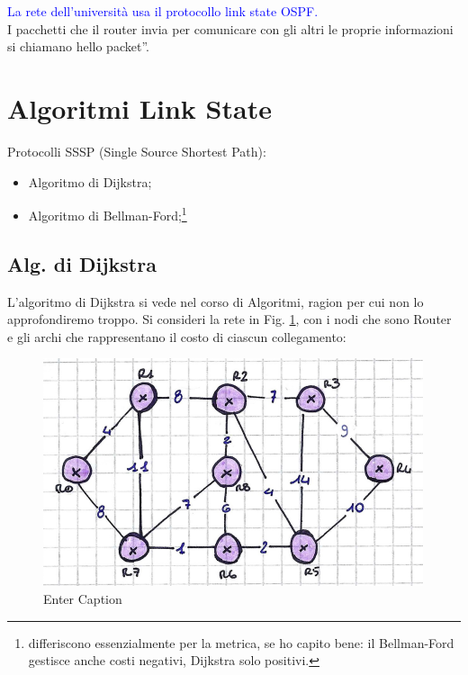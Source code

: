 \noindent \textcolor{Blue}{La rete dell'università usa il protocollo link state OSPF.}\\

\noindent I pacchetti che il router invia per comunicare con gli altri le proprie informazioni si chiamano \openapex hello packet''.\\

\section*{Algoritmi Link State}
\noindent Protocolli SSSP (Single Source Shortest Path):\begin{itemize}
    \item Algoritmo di Dijkstra;
    \item Algoritmo di Bellman-Ford;\footnote{differiscono essenzialmente per la metrica, se ho capito bene: il Bellman-Ford gestisce anche costi negativi, Dijkstra solo positivi.}
\end{itemize}
\subsection*{Alg. di Dijkstra}
\noindent L'algoritmo di Dijkstra si vede nel corso di Algoritmi, ragion per cui non lo approfondiremo troppo. Si consideri la rete in Fig. \ref{fig:dijkstra}, con i nodi che sono Router e gli archi che rappresentano il costo di ciascun collegamento:
\begin{figure} [ht]
    \centering
    \includegraphics[width=0.75\linewidth]{Figures//05/dijkstra.png}
    \caption{Enter Caption}
    \label{fig:dijkstra}
\end{figure}


